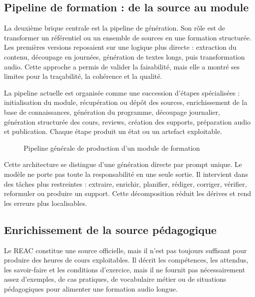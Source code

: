 \documentclass[12pt,a4paper]{article}
\begin{document}
\subsection{Pipeline de formation : de la source au module}

La deuxième brique centrale est la pipeline de génération. Son rôle est de transformer un
référentiel ou un ensemble de sources en une formation structurée. Les premières versions
reposaient sur une logique plus directe : extraction du contenu, découpage en journées,
génération de textes longs, puis transformation audio. Cette approche a permis de valider
la faisabilité, mais elle a montré ses limites pour la traçabilité, la cohérence et la qualité.

La pipeline actuelle est organisée comme une succession d'étapes spécialisées :
initialisation du module, récupération ou dépôt des sources, enrichissement de la base de
connaissances, génération du programme, découpage journalier, génération structurée des
cours, reviews, création des supports, préparation audio et publication. Chaque étape
produit un état ou un artefact exploitable.

\begin{figure}[h]
\centering
{}
\caption{Pipeline générale de production d'un module de formation}
\end{figure}

Cette architecture se distingue d'une génération directe par prompt unique. Le modèle ne
porte pas toute la responsabilité en une seule sortie. Il intervient dans des tâches plus
restreintes : extraire, enrichir, planifier, rédiger, corriger, vérifier, reformuler ou produire
un support. Cette décomposition réduit les dérives et rend les erreurs plus localisables.

\subsection{Enrichissement de la source pédagogique}

Le REAC constitue une source officielle, mais il n'est pas toujours suffisant pour produire
des heures de cours exploitables. Il décrit les compétences, les attendus, les savoir-faire
et les conditions d'exercice, mais il ne fournit pas nécessairement assez d'exemples, de
cas pratiques, de vocabulaire métier ou de situations pédagogiques pour alimenter une
formation audio longue.
\end{document}
